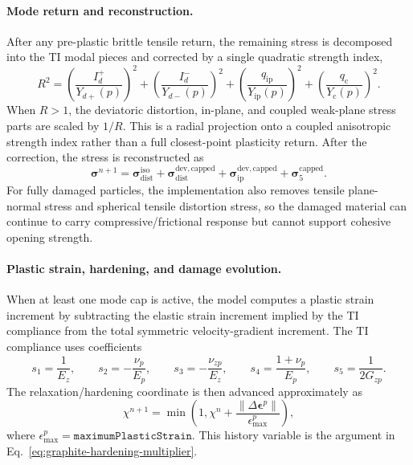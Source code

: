 \paragraph{Mode return and reconstruction.}
After any pre-plastic brittle tensile return, the remaining stress is decomposed into the TI modal pieces and corrected by a single quadratic strength index,
\begin{equation}
  R^2 =
  \left(\frac{I_d^+}{Y_{d+}(p)}\right)^2+
  \left(\frac{I_d^-}{Y_{d-}(p)}\right)^2+
  \left(\frac{q_{\mathrm{ip}}}{Y_{\mathrm{ip}}(p)}\right)^2+
  \left(\frac{q_{\mathrm{c}}}{Y_{\mathrm{c}}(p)}\right)^2 .
  \label{eq:graphite-quadratic-ti-yield}
\end{equation}
When \(R>1\), the deviatoric distortion, in-plane, and coupled weak-plane stress parts are scaled by \(1/R\).  This is a radial projection onto a coupled anisotropic strength index rather than a full closest-point plasticity return.  After the correction, the stress is reconstructed as
\begin{equation}
  \boldsymbol{\sigma}^{n+1} =
  \boldsymbol{\sigma}_{\mathrm{dist}}^{\mathrm{iso}}
  + \boldsymbol{\sigma}_{\mathrm{dist}}^{\mathrm{dev,capped}}
  + \boldsymbol{\sigma}_{\mathrm{ip}}^{\mathrm{dev,capped}}
  + \boldsymbol{\sigma}_{5}^{\mathrm{capped}}.
  \label{eq:graphite-stress-reconstruction}
\end{equation}
For fully damaged particles, the implementation also removes tensile plane-normal stress and spherical tensile distortion stress, so the damaged material can continue to carry compressive/frictional response but cannot support cohesive opening strength.

\paragraph{Plastic strain, hardening, and damage evolution.}
When at least one mode cap is active, the model computes a plastic strain increment by subtracting the elastic strain increment implied by the TI compliance from the total symmetric velocity-gradient increment.  The TI compliance uses coefficients
\begin{equation}
  s_1=\frac{1}{E_z},\qquad
  s_2=-\frac{\nu_p}{E_p},
  \qquad
  s_3=-\frac{\nu_{zp}}{E_z},
  \qquad
  s_4=\frac{1+\nu_p}{E_p},
  \qquad
  s_5=\frac{1}{2G_{zp}}.
  \label{eq:graphite-compliance-coefficients}
\end{equation}
The relaxation/hardening coordinate is then advanced approximately as
\begin{equation}
  \chi^{n+1}=\min\left(1,\chi^n+\frac{\|\Delta\boldsymbol{\epsilon}^p\|}{\epsilon^p_{\max}}\right),
  \label{eq:graphite-relaxation-update}
\end{equation}
where \(\epsilon^p_{\max}=\texttt{maximumPlasticStrain}\).  This history variable is the argument in Eq.~\eqref{eq:graphite-hardening-multiplier}.

